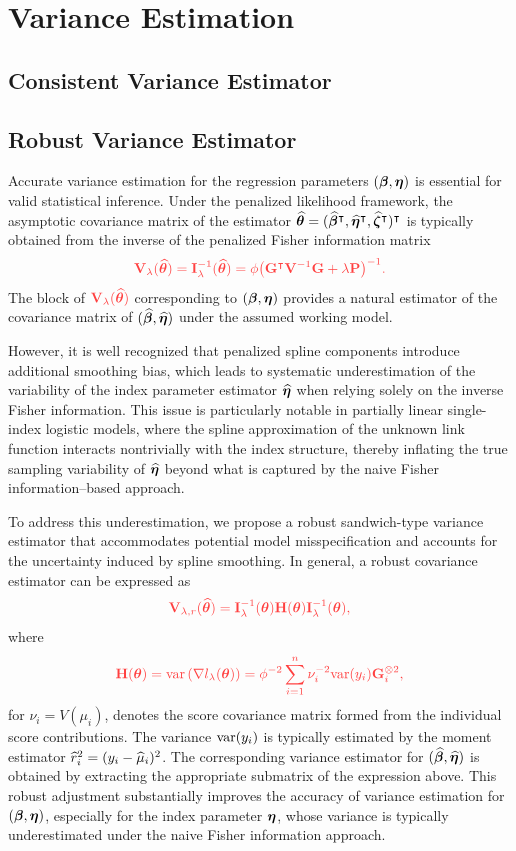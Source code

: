 \section{Variance Estimation}
\subsection{\y Consistent Variance Estimator}
\subsection{Robust Variance Estimator}
Accurate variance estimation for the regression parameters $(\bm\beta,\bm\eta)$ is essential for valid statistical inference. Under the penalized likelihood framework, the asymptotic covariance matrix of the estimator $\widehat{\bm\theta} = (\widehat{\bm\beta}^\intercal,\widehat{\bm\eta}^\intercal,\widehat{\bm\zeta}^\intercal)^\intercal$ is typically obtained from the inverse of the penalized Fisher information matrix
$$
{\x\BV_\lambda(\wh\Bt) = \BI_\lambda^{-1}(\wh\Bt) = \phi\bigl(\BG^\p\BV^{-1}\BG  + \lambda\BP\bigr)^{-1}.}
$$
The block of $\x\BV_\lambda(\wh\Bt)$ corresponding to $(\bm\beta,\bm\eta)$ provides a natural estimator of the covariance matrix of $(\widehat{\bm\beta},\widehat{\bm\eta})$ under the assumed working model.

However, it is well recognized that penalized spline components introduce additional smoothing bias, which leads to systematic underestimation of the variability of the index parameter estimator $\widehat{\bm\eta}$ when relying solely on the inverse Fisher information. This issue is particularly notable in partially linear single-index logistic models, where the spline approximation of the unknown link function interacts nontrivially with the index structure, thereby inflating the true sampling variability of $\widehat{\bm\eta}$ beyond what is captured by the naive Fisher information–based approach.

To address this underestimation, we propose a robust sandwich-type variance estimator that accommodates potential model misspecification and accounts for the uncertainty induced by spline smoothing. In general, a robust covariance estimator can be expressed as
$$
\x\BV_{\lambda,r}(\wh\Bt) = \BI_\lambda^{-1}(\Bt)\BH(\Bt)\BI_\lambda^{-1}(\Bt),
$$
where 
$$
\x\BH(\Bt) = \var\left(\nabla l_\lambda(\Bt)\right) = \phi^{-2}\sum_{i=1}^n\nu_i^{-2}\var(y_i)\BG_i^{\otimes 2},%
$$
for $\nu_i=V(\mu_i)$, denotes the score covariance matrix formed from the individual score contributions. The variance $\text{var}(y_i)$ is typically estimated by the moment estimator $\widehat r_i^2 = (y_i-\widehat\mu_i)^2$.
The corresponding variance estimator for $(\widehat{\bm\beta},\widehat{\bm\eta})$ is obtained by extracting the appropriate submatrix of the expression above. This robust adjustment substantially improves the accuracy of variance estimation for $(\bm\beta,\bm\eta)$, especially for the index parameter $\bm\eta$, whose variance is typically underestimated under the naive Fisher information approach.

